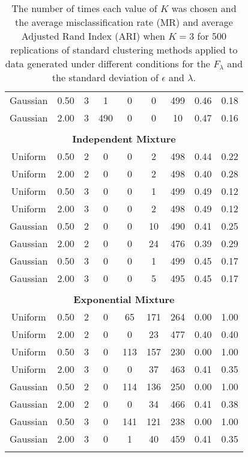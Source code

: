 \begin{table}[ht]
\begin{tabular}{ccc|cccccc}
  Gaussian & 0.50 &   3 &   1 &   0 &   0 & 499 & 0.46 & 0.18 \\ 
  Gaussian & 2.00 &   3 & 490 &   0 &   0 &  10 & 0.47 & 0.16 \\ 
   \\ \multicolumn{9}{c}{\textbf{Independent Mixture}}\\Uniform & 0.50 &   2 &   0 &   0 &   2 & 498 & 0.44 & 0.22 \\ 
  Uniform & 2.00 &   2 &   0 &   0 &   2 & 498 & 0.40 & 0.28 \\ 
  Uniform & 0.50 &   3 &   0 &   0 &   1 & 499 & 0.49 & 0.12 \\ 
  Uniform & 2.00 &   3 &   0 &   0 &   2 & 498 & 0.49 & 0.12 \\ 
  Gaussian & 0.50 &   2 &   0 &   0 &  10 & 490 & 0.41 & 0.25 \\ 
  Gaussian & 2.00 &   2 &   0 &   0 &  24 & 476 & 0.39 & 0.29 \\ 
  Gaussian & 0.50 &   3 &   0 &   0 &   1 & 499 & 0.45 & 0.17 \\ 
  Gaussian & 2.00 &   3 &   0 &   0 &   5 & 495 & 0.45 & 0.17 \\ 
   \\ \multicolumn{9}{c}{\textbf{Exponential Mixture}}\\Uniform & 0.50 &   2 &   0 &  65 & 171 & 264 & 0.00 & 1.00 \\ 
  Uniform & 2.00 &   2 &   0 &   0 &  23 & 477 & 0.40 & 0.40 \\ 
  Uniform & 0.50 &   3 &   0 & 113 & 157 & 230 & 0.00 & 1.00 \\ 
  Uniform & 2.00 &   3 &   0 &   0 &  37 & 463 & 0.41 & 0.35 \\ 
  Gaussian & 0.50 &   2 &   0 & 114 & 136 & 250 & 0.00 & 1.00 \\ 
  Gaussian & 2.00 &   2 &   0 &   0 &  34 & 466 & 0.41 & 0.38 \\ 
  Gaussian & 0.50 &   3 &   0 & 141 & 121 & 238 & 0.00 & 1.00 \\ 
  Gaussian & 2.00 &   3 &   0 &   1 &  40 & 459 & 0.41 & 0.35 \\ 
   \thickhline\end{tabular}
\caption{The number of times each value of $K$ was chosen and the average misclassification rate (MR) and average Adjusted Rand Index (ARI) when $K=3$ for 500 replications of standard clustering methods applied to data generated under different conditions for the $F_{\lambda}$ and the standard deviation of $\epsilon$ and $\lambda$.}
\label{tab:freq1}

\end{table}

